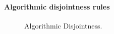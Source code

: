\paragraph{Algorithmic disjointness rules}

\begin{figure}[h]


  \caption{Algorithmic Disjointness.}
  \label{fig:disjointness}
\end{figure}


